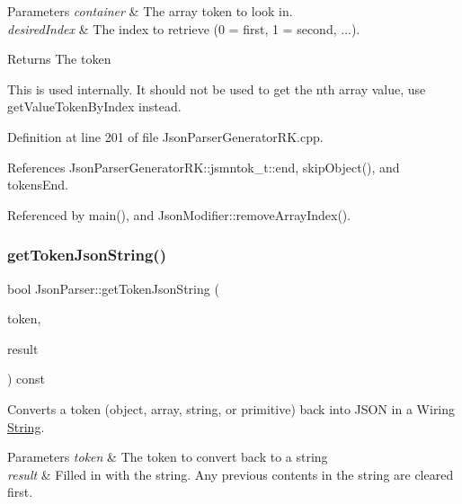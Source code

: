 \begin{DoxyParams}{Parameters}
{\em container} & The array token to look in.\\
\hline
{\em desired\+Index} & The index to retrieve (0 = first, 1 = second, ...).\\
\hline
\end{DoxyParams}
\begin{DoxyReturn}{Returns}
The token
\end{DoxyReturn}
This is used internally. It should not be used to get the nth array value, use get\+Value\+Token\+By\+Index instead. 

Definition at line 201 of file Json\+Parser\+Generator\+R\+K.\+cpp.



References Json\+Parser\+Generator\+R\+K\+::jsmntok\+\_\+t\+::end, skip\+Object(), and tokens\+End.



Referenced by main(), and Json\+Modifier\+::remove\+Array\+Index().

\mbox{\label{class_json_parser_a334ccfff663a5d3155a799049896d55c}} 
\subsubsection{\texorpdfstring{get\+Token\+Json\+String()}{getTokenJsonString()}\hspace{0.1cm}{\footnotesize\ttfamily [1/3]}}
{\footnotesize\ttfamily bool Json\+Parser\+::get\+Token\+Json\+String (\begin{DoxyParamCaption}\item[{const \hyperlink{struct_json_parser_generator_r_k_1_1jsmntok__t}{Json\+Parser\+Generator\+R\+K\+::jsmntok\+\_\+t} $\ast$}]{token,  }\item[{\hyperlink{class_string}{String} \&}]{result }\end{DoxyParamCaption}) const}



Converts a token (object, array, string, or primitive) back into J\+S\+ON in a Wiring \hyperlink{class_string}{String}. 


\begin{DoxyParams}{Parameters}
{\em token} & The token to convert back to a string\\
\hline
{\em result} & Filled in with the string. Any previous contents in the string are cleared first. \\
\hline
\end{DoxyParams}


